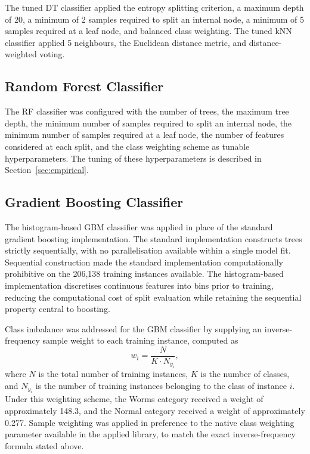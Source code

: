 \documentclass[conference,10pt]{IEEEtran}
\begin{document}
The tuned DT classifier applied the entropy splitting criterion, a maximum depth of 20, a minimum of 2 samples required to split an internal node, a minimum of 5 samples required at a leaf node, and balanced class weighting. The tuned kNN classifier applied 5 neighbours, the Euclidean distance metric, and distance-weighted voting.

\subsection{Random Forest Classifier}
The RF classifier was configured with the number of trees, the maximum tree depth, the minimum number of samples required to split an internal node, the minimum number of samples required at a leaf node, the number of features considered at each split, and the class weighting scheme as tunable hyperparameters. The tuning of these hyperparameters is described in Section~\ref{sec:empirical}.

\subsection{Gradient Boosting Classifier}
The histogram-based GBM classifier was applied in place of the standard gradient boosting implementation. The standard implementation constructs trees strictly sequentially, with no parallelisation available within a single model fit. Sequential construction made the standard implementation computationally prohibitive on the 206,138 training instances available. The histogram-based implementation discretises continuous features into bins prior to training, reducing the computational cost of split evaluation while retaining the sequential property central to boosting.

Class imbalance was addressed for the GBM classifier by supplying an inverse-frequency sample weight to each training instance, computed as
\begin{equation}
w_i = \frac{N}{K \cdot N_{y_i}},
\end{equation}
where $N$ is the total number of training instances, $K$ is the number of classes, and $N_{y_i}$ is the number of training instances belonging to the class of instance $i$. Under this weighting scheme, the Worms category received a weight of approximately 148.3, and the Normal category received a weight of approximately 0.277. Sample weighting was applied in preference to the native class weighting parameter available in the applied library, to match the exact inverse-frequency formula stated above.
\end{document}
